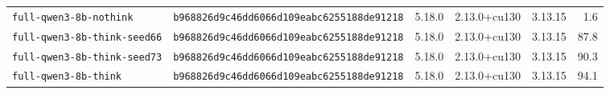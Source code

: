 \begin{tabular}{@{}l l l l l r@{}}
\texttt{full-qwen3-8b-nothink} & \texttt{b968826d9c46dd6066d109eabc6255188de91218} & 5.18.0 & 2.13.0+cu130 & 3.13.15 & 1.6 \\
\texttt{full-qwen3-8b-think-seed66} & \texttt{b968826d9c46dd6066d109eabc6255188de91218} & 5.18.0 & 2.13.0+cu130 & 3.13.15 & 87.8 \\
\texttt{full-qwen3-8b-think-seed73} & \texttt{b968826d9c46dd6066d109eabc6255188de91218} & 5.18.0 & 2.13.0+cu130 & 3.13.15 & 90.3 \\
\texttt{full-qwen3-8b-think} & \texttt{b968826d9c46dd6066d109eabc6255188de91218} & 5.18.0 & 2.13.0+cu130 & 3.13.15 & 94.1 \\
\bottomrule
\end{tabular}
